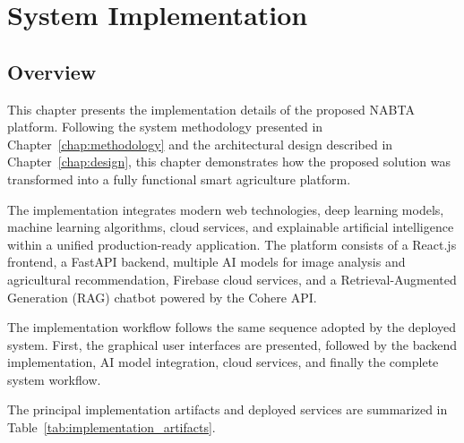 
\chapter{System Implementation}
\label{chap:implementation}


\section{Overview}
\label{sec:implementation_overview}

This chapter presents the implementation details of the proposed NABTA platform. Following the system methodology presented in Chapter~\ref{chap:methodology} and the architectural design described in Chapter~\ref{chap:design}, this chapter demonstrates how the proposed solution was transformed into a fully functional smart agriculture platform.

The implementation integrates modern web technologies, deep learning models, machine learning algorithms, cloud services, and explainable artificial intelligence within a unified production-ready application. The platform consists of a React.js frontend, a FastAPI backend, multiple AI models for image analysis and agricultural recommendation, Firebase cloud services, and a Retrieval-Augmented Generation (RAG) chatbot powered by the Cohere API.

The implementation workflow follows the same sequence adopted by the deployed system. First, the graphical user interfaces are presented, followed by the backend implementation, AI model integration, cloud services, and finally the complete system workflow.

The principal implementation artifacts and deployed services are summarized in Table~\ref{tab:implementation_artifacts}.


